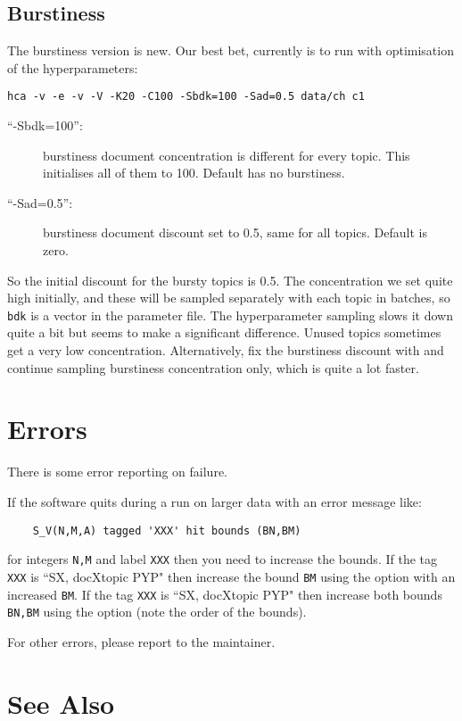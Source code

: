 \documentclass[a4paper,english]{article}
\begin{document}
\subsection{Burstiness}

The burstiness version is new.  Our best bet, currently is to run
with optimisation of the hyperparameters:
\begin{verbatim}
hca -v -e -v -V -K20 -C100 -Sbdk=100 -Sad=0.5 data/ch c1
\end{verbatim}
\begin{description}
\item[``-Sbdk=100'':]  burstiness document concentration is different
for every topic.  This initialises all of them to 100.
Default has no burstiness.
\item[``-Sad=0.5'':] burstiness document discount set to 
0.5, same for all topics.  Default is zero.
\end{description}
So the initial discount for the bursty topics is
0.5.   The concentration we set quite high initially, 
and these will be sampled separately with
each topic in batches, so \texttt{bdk} is a vector in the
parameter file.
The hyperparameter sampling slows it down quite a bit but seems to
make a significant difference.  Unused topics sometimes
get a very low concentration.
Alternatively, fix the burstiness discount with 
 and continue sampling burstiness concentration only,
which is quite a lot faster.

\section{Errors}

There is some error reporting on failure.

If the software quits during a run on larger data with an
error message like:
\begin{verbatim}
    S_V(N,M,A) tagged 'XXX' hit bounds (BN,BM)
\end{verbatim}
for integers \texttt{N,M} and label \texttt{XXX} then you
need to increase the bounds.
If the tag \texttt{XXX} is ``SX, docXtopic PYP"
then increase the bound \texttt{BM} using the option
 with an increased \texttt{BM}.
If the tag \texttt{XXX} is ``SX, docXtopic PYP"
then increase both bounds \texttt{BN,BM} using the option
(note the order of the bounds).

For other errors, please report to the
maintainer.

\section{See Also}
\end{document}
